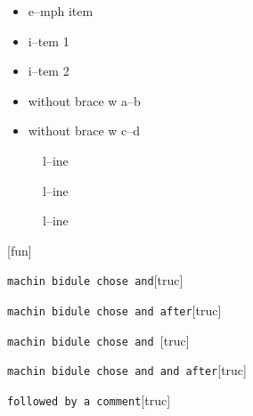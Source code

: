\documentclass{book}
\begin{document}
\begin{titlepage}
\begin{itemize}[label=\emph{} after emph]
\item e--mph item
\end{itemize}

\begin{itemize}[label=\textbullet{} a--n itemize line]
\item i--tem 1
\item i--tem 2
\end{itemize}

\begin{itemize}[label={}]
\item without brace w a--b
\item without brace w c--d
\end{itemize}

\begin{description}
\item[{\parbox[b]{\linewidth}{%
a}}]
l--ine
\end{description}

\begin{description}
\item[{\parbox[b]{\linewidth}{%
a--missing style formatting}}]
l--ine
\end{description}

\begin{description}
\item[{\parbox[b]{\linewidth}{%
a\\
\index[fn]{a@\texttt{a}}%
\index[cp]{index entry between item and itemx}%
b
\index[fn]{b@\texttt{b}}%
}}]
l--ine
\end{description}

\noindent\texttt\bgroup{}\egroup{}\hfill[fun]



\noindent\texttt\bgroup{}machin bidule chose and\egroup{}\hfill[truc]



%
\noindent\texttt\bgroup{}machin bidule chose and  after\egroup{}\hfill[truc]



%
\noindent\texttt\bgroup{}machin bidule chose and \egroup{}\hfill[truc]



%
\noindent\texttt\bgroup{}machin bidule chose and and after\egroup{}\hfill[truc]



%
\noindent\texttt\bgroup{}followed by a comment\egroup{}\hfill[truc]




\end{titlepage}
\end{document}
